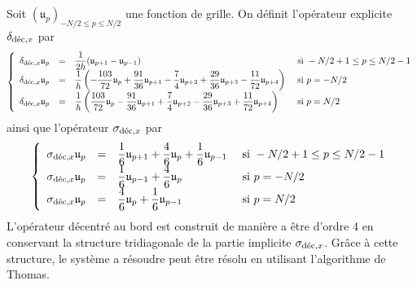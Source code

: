 Soit $(\mathfrak{u}_p)_{-N/2 \leq p \leq N/2}$ une fonction de grille. On définit l'opérateur explicite $\delta_{\dec,x}$ par
\begin{equation}
\left\lbrace
\begin{array}{rcll}
\delta_{\dec,x} \mathfrak{u}_p & = & \dfrac{1}{2 h} (\mathfrak{u}_{p+1}-\mathfrak{u}_{p-1}) & \text{ si } -N/2+1 \leq p \leq N/2-1 \\
\delta_{\dec,x} \mathfrak{u}_p & = & \dfrac{1}{h} \left( -\dfrac{103}{72} \mathfrak{u}_p + \dfrac{91}{36} \mathfrak{u}_{p+1} - \dfrac{7}{4} \mathfrak{u}_{p+2} + \dfrac{29}{36} \mathfrak{u}_{p+3} - \dfrac{11}{72} \mathfrak{u}_{p+4} \right) & \text{ si } p = -N/2 \\
\delta_{\dec,x} \mathfrak{u}_p & = & \dfrac{1}{h} \left( \dfrac{103}{72} \mathfrak{u}_p - \dfrac{91}{36} \mathfrak{u}_{p+1} + \dfrac{7}{4} \mathfrak{u}_{p+2} - \dfrac{29}{36} \mathfrak{u}_{p+3} + \dfrac{11}{72} \mathfrak{u}_{p+4} \right) & \text{ si } p = N/2 \\
\end{array}
\right.
\end{equation}
ainsi que l'opérateur $\sigma_{\dec,x}$ par
\begin{equation}
\left\lbrace
\begin{array}{rcll}
\sigma_{\dec,x} \mathfrak{u}_p & = & \dfrac{1}{6} \mathfrak{u}_{p+1} + \dfrac{4}{6} \mathfrak{u}_{p} + \dfrac{1}{6} \mathfrak{u}_{p-1} & \text{ si } -N/2+1 \leq p \leq N/2-1 \\
\sigma_{\dec,x} \mathfrak{u}_p & = & \dfrac{1}{6} \mathfrak{u}_{p-1} + \dfrac{4}{6} \mathfrak{u}_{p} & \text{ si } p = -N/2 \\
\sigma_{\dec,x} \mathfrak{u}_p & = & \dfrac{4}{6} \mathfrak{u}_{p} + \dfrac{1}{6} \mathfrak{u}_{p-1} & \text{ si } p = N/2 \\
\end{array}
\right.
\end{equation}
L'opérateur décentré au bord est construit de manière a être d'ordre 4 en conservant la structure tridiagonale de la partie implicite $\sigma_{\dec,x}$. Grâce à cette structure, le système a résoudre peut être résolu en utilisant l'algorithme de Thomas.

